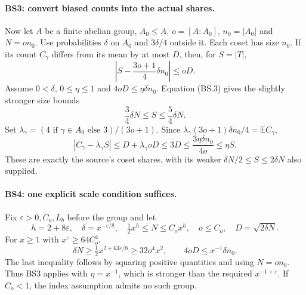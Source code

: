 \documentclass[11pt,a4paper]{article}
\numberwithin{equation}{section}
\theoremstyle{remark}\newtheorem{remark}[theorem]{Remark}
\begin{document}
\paragraph{BS3: convert biased counts into the actual shares.}
Now let $A$ be a finite abelian group, $A_0\le A$,
$o=[A:A_0]$, $n_0=|A_0|$ and $N=on_0$.
Use probabilities $\delta$ on $A_0$ and $3\delta/4$ outside it.
Each coset has size $n_0$. If its count $C_\gamma$ differs from its
mean by at most $D$, then, for $S=|T|$,
\[
 \left|S-\frac{3o+1}{4}\delta n_0\right|\le oD.
                                                        \tag{BS.3}
\]
Assume $0<\delta$, $0\le\eta\le1$ and
$4oD\le\eta\delta n_0$. Equation (BS.3) gives the slightly
stronger size bounds
\[
 \frac34\delta N\le S\le\frac54\delta N.
                                                        \tag{BS.4}
\]
Set $\lambda_\gamma=(4\text{ if }\gamma\in A_0
\text{ else }3)/(3o+1)$. Since
$\lambda_\gamma(3o+1)\delta n_0/4=\mathbb EC_\gamma$,
\[
 |C_\gamma-\lambda_\gamma S|
 \le D+\lambda_\gamma oD\le3D
 \le\frac{3\eta\delta n_0}{4o}
 \le\eta S.                                            \tag{BS.5}
\]
These are exactly the source's coset shares, with its weaker
$\delta N/2\le S\le2\delta N$ also supplied.

\paragraph{BS4: one explicit scale condition suffices.}
Fix $\varepsilon>0,C_o,L_b$ before the group and let
\[
 h=2+8\varepsilon,\quad
 \delta=x^{-\varepsilon/8},\quad
 \tfrac12x^h\le N\le C_ox^h,\quad o\le C_o,\quad
 D=\sqrt{2\delta N}.
\]
For $x\ge1$ with $x^\varepsilon\ge64C_o^4$,
\[
 \delta N\ge\tfrac12x^{2+63\varepsilon/8}
 \ge32o^4x^2,
 \qquad
 4oD\le x^{-1}\delta n_0.                            \tag{BS.6}
\]
The last inequality follows by squaring positive quantities and
using $N=on_0$. Thus BS3 applies with $\eta=x^{-1}$,
which is stronger than the required $x^{-1+\varepsilon}$.
If $C_o<1$, the index assumption admits no such group.
\end{document}
